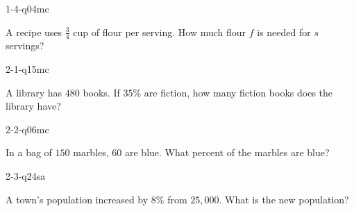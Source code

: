
\begin{practiceQuestion}{1-4-q04}{mc}
\begin{questionText}
A recipe uses $\frac{3}{4}$ cup of flour per serving. How much flour $f$ is needed for $s$ servings?
\end{questionText}
\end{practiceQuestion}

\begin{practiceQuestion}{2-1-q15}{mc}
\begin{questionText}
A library has $480$ books. If $35\%$ are fiction, how many fiction books does the library have?
\end{questionText}
\end{practiceQuestion}

\begin{practiceQuestion}{2-2-q06}{mc}
\begin{questionText}
In a bag of $150$ marbles, $60$ are blue. What percent of the marbles are blue?
\end{questionText}
\end{practiceQuestion}

\begin{practiceQuestion}{2-3-q24}{sa}
\begin{questionText}
A town's population increased by $8\%$ from $25{,}000$. What is the new population?
\end{questionText}
\end{practiceQuestion}

